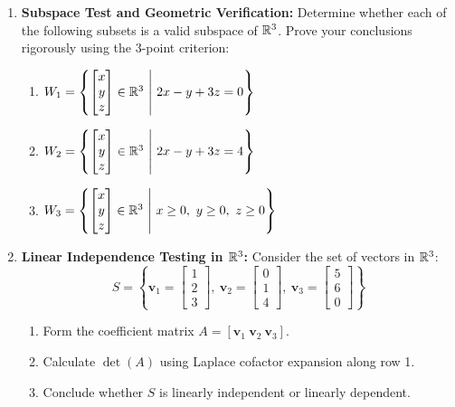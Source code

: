 \begin{enumerate}
    \item \textbf{Subspace Test and Geometric Verification:}
    Determine whether each of the following subsets is a valid subspace of $\mathbb{R}^3$. Prove your conclusions rigorously using the 3-point criterion:
    \begin{enumerate}
        \item $W_1 = \left\{ \begin{bmatrix} x \\ y \\ z \end{bmatrix} \in \mathbb{R}^3 \ \middle|\ 2x - y + 3z = 0 \right\}$
        \item $W_2 = \left\{ \begin{bmatrix} x \\ y \\ z \end{bmatrix} \in \mathbb{R}^3 \ \middle|\ 2x - y + 3z = 4 \right\}$
        \item $W_3 = \left\{ \begin{bmatrix} x \\ y \\ z \end{bmatrix} \in \mathbb{R}^3 \ \middle|\ x \ge 0, \ y \ge 0, \ z \ge 0 \right\}$
    \end{enumerate}

    \item \textbf{Linear Independence Testing in $\mathbb{R}^3$:}
    Consider the set of vectors in $\mathbb{R}^3$:
    \begin{equation}
    S = \left\{ \mathbf{v}_1 = \begin{bmatrix} 1 \\ 2 \\ 3 \end{bmatrix}, \ \mathbf{v}_2 = \begin{bmatrix} 0 \\ 1 \\ 4 \end{bmatrix}, \ \mathbf{v}_3 = \begin{bmatrix} 5 \\ 6 \\ 0 \end{bmatrix} \right\}
    \end{equation}
    \begin{enumerate}
        \item Form the coefficient matrix $A = [\mathbf{v}_1 \ \mathbf{v}_2 \ \mathbf{v}_3]$.
        \item Calculate $\det(A)$ using Laplace cofactor expansion along row 1.
        \item Conclude whether $S$ is linearly independent or linearly dependent.
    \end{enumerate}


\end{enumerate}
